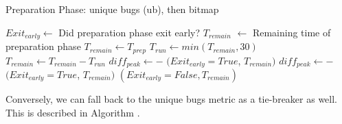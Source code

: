 \begin{algorithm}[ht!]
  \caption{Preparation Phase: unique bugs (ub), then bitmap}\label{prep-phase-with-ub-bitmap}
  \small
  \begin{algorithmic}[1]
    \Output
      \State $Exit_{early} \gets$ Did preparation phase exit early?
      \State $T_{remain}$ $\gets$ Remaining time of preparation phase
    \EndOutput
      \State $T_{remain} \gets T_{prep}$
        \State $T_{run} \gets min(T_{remain},30)$
            \State {}
          \EndFor
        \Else {}
          \State {}
        \EndIf
        \State $T_{remain} \gets T_{remain} - T_{run}$
        \State $diff_{peak} \gets $$ - $
          \State \Return $(Exit_{early}=True$, $T_{remain})$
        \Else {}
          \State $diff_{peak} \gets $$ - $
              \State \Return $(Exit_{early}=True$, $T_{remain})$
          \EndIf
        \EndIf
      \EndWhile
      \State \Return $(Exit_{early}=False, T_{remain})$
    \EndFunction
  \end{algorithmic}
\end{algorithm}

Conversely, we can fall back to the unique bugs metric as a tie-breaker as well. This is described in
Algorithm .

